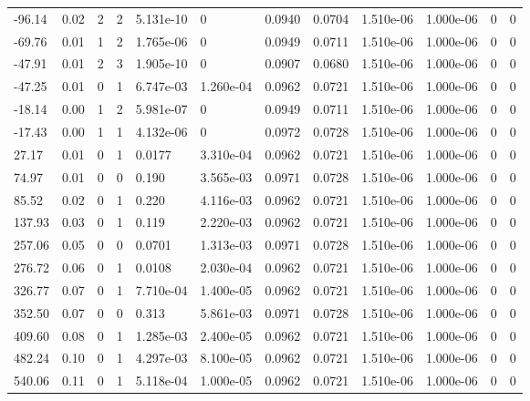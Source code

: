 \documentclass[preview]{standalone}
\begin{document}
{{\begin{tabular}{L{1.2cm}C{1.2cm} C{0.3cm}C{0.5cm} C{1.4cm}C{1.4cm} C{1.4cm}C{1.4cm} C{1.6cm}C{1.6cm} C{1.6cm}C{1.6cm}}
  -96.14  &  0.02  & 2     &  2 &  5.131e-10  & 0  &  0.0940&   0.0704& 1.510e-06 & 1.000e-06   &  0 & 0  \\ 
  -69.76  &  0.01  & 1     &  2 &  1.765e-06  & 0  &  0.0949&   0.0711& 1.510e-06 & 1.000e-06   &  0 & 0  \\ 
  -47.91  &  0.01  & 2     &  3 &  1.905e-10  & 0  &  0.0907&   0.0680& 1.510e-06 & 1.000e-06   &  0 & 0  \\ 
  -47.25  &  0.01  & 0     &  1 &  6.747e-03  & 1.260e-04  &  0.0962&   0.0721& 1.510e-06 & 1.000e-06   &  0 & 0  \\ 
  -18.14  &  0.00  & 1     &  2 &  5.981e-07  & 0  &  0.0949&   0.0711& 1.510e-06 & 1.000e-06   &  0 & 0  \\ 
  -17.43  &  0.00  & 1     &  1 &  4.132e-06  & 0  &  0.0972&   0.0728& 1.510e-06 & 1.000e-06   &  0 & 0  \\ 
  27.17  &  0.01  & 0     &  1 &  0.0177  & 3.310e-04  &  0.0962&   0.0721& 1.510e-06 & 1.000e-06   &  0 & 0  \\ 
  74.97  &  0.01  & 0     &  0 &  0.190  & 3.565e-03  &  0.0971&   0.0728& 1.510e-06 & 1.000e-06   &  0 & 0  \\ 
  85.52  &  0.02  & 0     &  1 &  0.220  & 4.116e-03  &  0.0962&   0.0721& 1.510e-06 & 1.000e-06   &  0 & 0  \\ 
  137.93  &  0.03  & 0     &  1 &  0.119  & 2.220e-03  &  0.0962&   0.0721& 1.510e-06 & 1.000e-06   &  0 & 0  \\ 
  257.06  &  0.05  & 0     &  0 &  0.0701  & 1.313e-03  &  0.0971&   0.0728& 1.510e-06 & 1.000e-06   &  0 & 0  \\ 
  276.72  &  0.06  & 0     &  1 &  0.0108  & 2.030e-04  &  0.0962&   0.0721& 1.510e-06 & 1.000e-06   &  0 & 0  \\ 
  326.77  &  0.07  & 0     &  1 &  7.710e-04  & 1.400e-05  &  0.0962&   0.0721& 1.510e-06 & 1.000e-06   &  0 & 0  \\ 
  352.50  &  0.07  & 0     &  0 &  0.313  & 5.861e-03  &  0.0971&   0.0728& 1.510e-06 & 1.000e-06   &  0 & 0  \\ 
  409.60  &  0.08  & 0     &  1 &  1.285e-03  & 2.400e-05  &  0.0962&   0.0721& 1.510e-06 & 1.000e-06   &  0 & 0  \\ 
  482.24  &  0.10  & 0     &  1 &  4.297e-03  & 8.100e-05  &  0.0962&   0.0721& 1.510e-06 & 1.000e-06   &  0 & 0  \\ 
  540.06  &  0.11  & 0     &  1 &  5.118e-04  & 1.000e-05  &  0.0962&   0.0721& 1.510e-06 & 1.000e-06   &  0 & 0  \\ 

\end{tabular}}}
\end{document}

